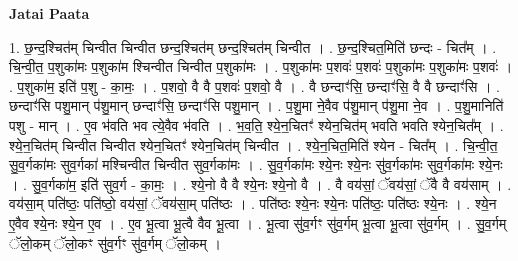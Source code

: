 \documentclass[17pt]{extarticle}
\begin{document}
\textbf{Jatai Paata} \newline

1. छ॒न्द॒श्चित॑म् चिन्वीत चिन्वीत छन्द॒श्चित॑म् छन्द॒श्चित॑म् चिन्वीत । . छ॒न्द॒श्चित॒मिति॑ छन्दः - चित᳚म् । . चि॒न्वी॒त॒ प॒शुका॑मः प॒शुका॑म श्चिन्वीत चिन्वीत प॒शुका॑मः । . प॒शुका॑मः प॒शवः॑ प॒शवः॑ प॒शुका॑मः प॒शुका॑मः प॒शवः॑ । . प॒शुका॑म॒ इति॑ प॒शु - का॒मः॒ । . प॒शवो॒ वै वै प॒शवः॑ प॒शवो॒ वै । . वै छन्दाꣳ॑सि॒ छन्दाꣳ॑सि॒ वै वै छन्दाꣳ॑सि । . छन्दाꣳ॑सि पशु॒मान् प॑शु॒मान् छन्दाꣳ॑सि॒ छन्दाꣳ॑सि पशु॒मान् । . प॒शु॒मा ने॒वैव प॑शु॒मान् प॑शु॒मा ने॒व । . प॒शु॒मानिति॑ पशु - मान् । . ए॒व भ॑वति भव त्ये॒वैव भ॑वति । . भ॒व॒ति॒ श्ये॒न॒चितꣳ॑ श्येन॒चित॑म् भवति भवति श्येन॒चित᳚म् । . श्ये॒न॒चित॑म् चिन्वीत चिन्वीत श्येन॒चितꣳ॑ श्येन॒चित॑म् चिन्वीत । . श्ये॒न॒चित॒मिति॑ श्येन - चित᳚म् । . चि॒न्वी॒त॒ सु॒व॒र्गका॑मः सुव॒र्गका॑ मश्चिन्वीत चिन्वीत सुव॒र्गका॑मः । . सु॒व॒र्गका॑मः श्ये॒नः श्ये॒नः सु॑व॒र्गका॑मः सुव॒र्गका॑मः श्ये॒नः । . सु॒व॒र्गका॑म॒ इति॑ सुव॒र्ग - का॒मः॒ । . श्ये॒नो वै वै श्ये॒नः श्ये॒नो वै । . वै वय॑सां॒ ॅवय॑सां॒ ॅवै वै वय॑साम् । . वय॑सा॒म् पति॑ष्ठः॒ पति॑ष्ठो॒ वय॑सां॒ ॅवय॑सा॒म् पति॑ष्ठः । . पति॑ष्ठः श्ये॒नः श्ये॒नः पति॑ष्ठः॒ पति॑ष्ठः श्ये॒नः । . श्ये॒न ए॒वैव श्ये॒नः श्ये॒न ए॒व । . ए॒व भू॒त्वा भू॒त्वै वैव भू॒त्वा । . भू॒त्वा सु॑व॒र्गꣳ सु॑व॒र्गम् भू॒त्वा भू॒त्वा सु॑व॒र्गम् । . सु॒व॒र्गम् ॅलो॒कम् ॅलो॒कꣳ सु॑व॒र्गꣳ सु॑व॒र्गम् ॅलो॒कम् । \newline
\end{document}
